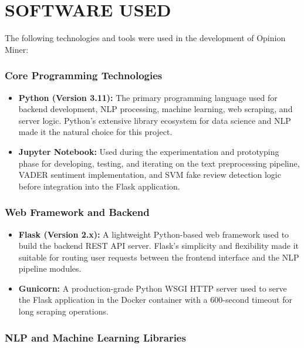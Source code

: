 \documentclass[12pt,a4paper]{report}
\begin{document}
\section{SOFTWARE USED}

The following technologies and tools were used in the development of Opinion Miner:

\subsubsection*{Core Programming Technologies}

\begin{itemize}
  \item \textbf{Python (Version 3.11):} The primary programming language used for backend development, NLP processing, machine learning, web scraping, and server logic. Python's extensive library ecosystem for data science and NLP made it the natural choice for this project.

  \item \textbf{Jupyter Notebook:} Used during the experimentation and prototyping phase for developing, testing, and iterating on the text preprocessing pipeline, VADER sentiment implementation, and SVM fake review detection logic before integration into the Flask application.
\end{itemize}

\subsubsection*{Web Framework and Backend}

\begin{itemize}
  \item \textbf{Flask (Version 2.x):} A lightweight Python-based web framework used to build the backend REST API server. Flask's simplicity and flexibility made it suitable for routing user requests between the frontend interface and the NLP pipeline modules.

  \item \textbf{Gunicorn:} A production-grade Python WSGI HTTP server used to serve the Flask application in the Docker container with a 600-second timeout for long scraping operations.
\end{itemize}

\subsubsection*{NLP and Machine Learning Libraries}
\end{document}
